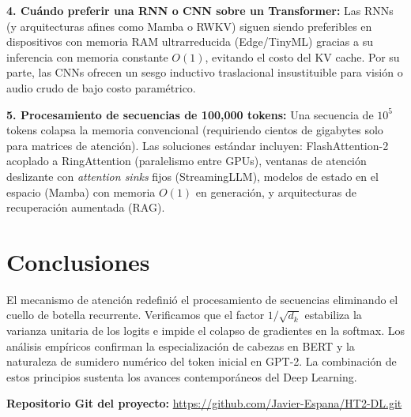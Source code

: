 \documentclass[10pt,letterpaper]{article}
\begin{document}
\textbf{4. Cuándo preferir una RNN o CNN sobre un Transformer:}
Las RNNs (y arquitecturas afines como Mamba o RWKV) siguen siendo preferibles en dispositivos con memoria RAM ultrarreducida (Edge/TinyML) gracias a su inferencia con memoria constante $O(1)$, evitando el costo del KV cache. Por su parte, las CNNs ofrecen un sesgo inductivo traslacional insustituible para visión o audio crudo de bajo costo paramétrico.

\textbf{5. Procesamiento de secuencias de 100,000 tokens:}
Una secuencia de $10^5$ tokens colapsa la memoria convencional (requiriendo cientos de gigabytes solo para matrices de atención). Las soluciones estándar incluyen: FlashAttention-2 acoplado a RingAttention (paralelismo entre GPUs), ventanas de atención deslizante con \textit{attention sinks} fijos (StreamingLLM), modelos de estado en el espacio (Mamba) con memoria $O(1)$ en generación, y arquitecturas de recuperación aumentada (RAG).

\section{Conclusiones}
\label{sec:conclusiones}

El mecanismo de atención redefinió el procesamiento de secuencias eliminando el cuello de botella recurrente. Verificamos que el factor $1/\sqrt{d_k}$ estabiliza la varianza unitaria de los logits e impide el colapso de gradientes en la softmax. Los análisis empíricos confirman la especialización de cabezas en BERT y la naturaleza de sumidero numérico del token inicial en GPT-2. La combinación de estos principios sustenta los avances contemporáneos del Deep Learning.

\vspace{0.15cm}
\noindent\textbf{Repositorio Git del proyecto:} \url{https://github.com/Javier-Espana/HT2-DL.git}

\vspace{-0.1cm}
\small


\end{document}
